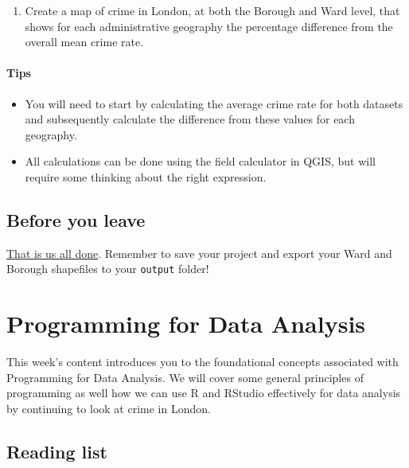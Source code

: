 \documentclass[
]{book}
\providecommand{\tightlist}{%
  \setlength{\itemsep}{0pt}\setlength{\parskip}{0pt}}
\begin{document}
\begin{enumerate}
\def\labelenumi{\arabic{enumi}.}
\setcounter{enumi}{1}
\tightlist
\item
  Create a map of crime in London, at both the Borough and Ward level, that shows for each administrative geography the percentage difference from the overall mean crime rate.
\end{enumerate}

\hypertarget{tips}{%
\subsubsection*{Tips}\label{tips}}

\begin{itemize}
\tightlist
\item
  You will need to start by calculating the average crime rate for both datasets and subsequently calculate the difference from these values for each geography.
\item
  All calculations can be done using the field calculator in QGIS, but will require some thinking about the right expression.
\end{itemize}

\hypertarget{byl-w03}{%
\section{Before you leave}\label{byl-w03}}

\href{https://www.youtube.com/watch?v=3wxyN3z9PL4}{That is us all done}. Remember to save your project and export your Ward and Borough shapefiles to your \texttt{output} folder!

\hypertarget{programming-for-data-analysis}{%
\chapter{Programming for Data Analysis}\label{programming-for-data-analysis}}

This week's content introduces you to the foundational concepts associated with Programming for Data Analysis. We will cover some general principles of programming as well how we can use R and RStudio effectively for data analysis by continuing to look at crime in London.

\hypertarget{reading-w04}{%
\section{Reading list}\label{reading-w04}}
\end{document}
